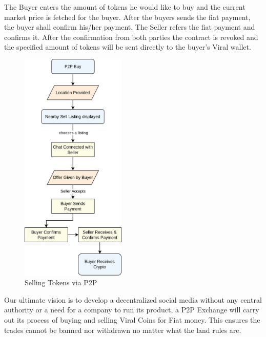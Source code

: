 \documentclass[conference]{IEEEtran}
\begin{document}
The Buyer enters the amount of tokens he would like to buy and the current market price is fetched for the buyer. After the buyers sends the fiat payment, the buyer shall confirm his/her payment. The Seller refers the fiat payment and confirms it. After the confirmation from both parties the contract is revoked and the specified amount of tokens will be sent directly to the buyer's Viral wallet.\\
\begin{figure}[H]
\begin{center}
\includegraphics[width=5cm]{p2p-buy}
\caption{Selling Tokens via P2P}
\end{center}
\end{figure}
Our ultimate vision is to develop a decentralized social media without any central authority or a need for a company to run its product, a P2P Exchange will carry out its process of buying and selling Viral Coins for Fiat money. This ensures the trades cannot be banned nor withdrawn no matter what the land rules are.\\
\end{document}
